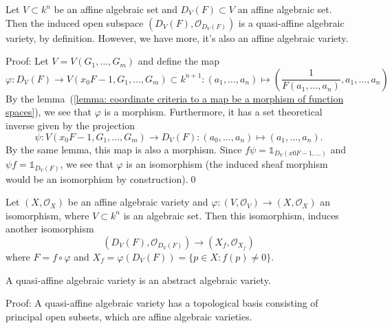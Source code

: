 \begin{dang}
    \begin{lemma}
        Let $V\subset k^n$ be an affine algebraic set and $D_V(F)\subset V$ an affine algebraic set. Then 
        the induced open subspace 
        $(D_V(F), \mathcal{O}_{D_V(F)})$ is a quasi-affine algebraic variety, by definition. However, we have more, 
        it's also an affine algebraic variety.
    \end{lemma}
\end{dang}
Proof: Let $V=V(G_1,\dots, G_m)$ and define the map 
\begin{equation}
    \varphi: D_V(F)\rightarrow V(x_0F-1, G_1,\dots, G_m)\subset k^{n+1}:(a_1,\dots,a_n)\mapsto 
    (\frac{1}{F(a_1,\dots, a_n)},a_1,\dots, a_n)
\end{equation}
By the lemma~(\ref{lemma: coordinate criteria to a map be a morphism of function spaces}), we see that 
$\varphi$ is a morphism. Furthermore, it has a set theoretical inverse given by the projection 
\begin{equation}
    \psi:V(x_0F-1, G_1,\dots, G_m)\to D_V(F):(a_0,\dots,a_n)\mapsto (a_1,\dots, a_n).
\end{equation}
By the same lemma, this map is also a morphism. Since $f\psi = \mathds{1}_{D_V(x0F-1,\dots)}$ and 
$\psi f = \mathds{1}_{D_V(F)}$, we see that $\varphi$ is an isomorphism (the induced 
sheaf morphism would be an isomorphism by construction).\qed

\begin{dang}
    \begin{remark}
        Let $(X,\mathcal{O}_X)$ be an affine algebraic variety and 
        $\varphi:(V,\mathcal{O}_V)\to (X,\mathcal{O}_X)$ an isomorphism, where $V\subset k^n$ is an algebraic set. 
        Then this isomorphism, induces another isomorphism
        \begin{equation}
            (D_V(F),\mathcal{O}_{D_V(F)}) \to (X_f,\mathcal{O}_{X_f})
        \end{equation}
        where $F=f\circ\varphi$ and $X_f = \varphi(D_V(F))=\{p\in X: f(p)\neq0\}$.
    \end{remark}
\end{dang}

\begin{dang}
    \begin{corollary}
        A quasi-affine algebraic variety is an abstract algebraic variety.
    \end{corollary}
\end{dang}
Proof: A quasi-affine algebraic variety has a topological basis consisting of principal open subsets, which 
are affine algebraic varieties.




